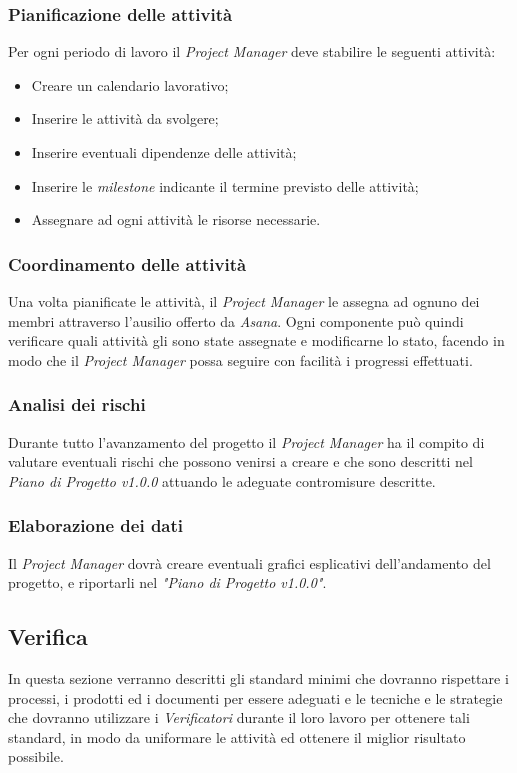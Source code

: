 \documentclass[12pt,a4paper,titlepage]{article}
\begin{document}
\subsubsection{Pianificazione delle attività}
Per ogni periodo di lavoro il \textit{Project Manager} deve stabilire le seguenti attività:
\begin{itemize}
	\item Creare un calendario lavorativo;
	\item Inserire le attività da svolgere;
	\item Inserire eventuali dipendenze delle attività;
	\item Inserire le \textit{milestone} indicante il termine previsto delle attività;
	\item Assegnare ad ogni attività le risorse necessarie.
\end{itemize}
\subsubsection{Coordinamento delle attività}
Una volta pianificate le attività, il \textit{Project Manager} le assegna ad ognuno dei membri attraverso
l'ausilio offerto da \textit{Asana}. Ogni componente può quindi verificare quali attività 
gli sono state assegnate e modificarne lo stato, facendo in modo che il \textit{Project Manager} possa 
seguire con facilità i progressi effettuati.
\subsubsection{Analisi dei rischi}
Durante tutto l'avanzamento del progetto il \textit{Project Manager} ha il compito di valutare eventuali
rischi che possono venirsi a creare e che sono descritti nel \textit{Piano di Progetto v1.0.0} attuando 
le adeguate contromisure descritte.
\subsubsection{Elaborazione dei dati}
Il \textit{Project Manager} dovrà creare eventuali grafici esplicativi dell'andamento del progetto, e 
riportarli nel \textit{"Piano di Progetto v1.0.0"}.
\subsection{Verifica}
In questa sezione verranno descritti gli standard minimi che dovranno rispettare i processi, i prodotti ed i documenti per essere adeguati e le tecniche e le strategie che dovranno utilizzare i \textit{Verificatori} durante il loro lavoro per ottenere tali standard,  in modo da uniformare le attività ed ottenere il miglior risultato possibile.
\end{document}

